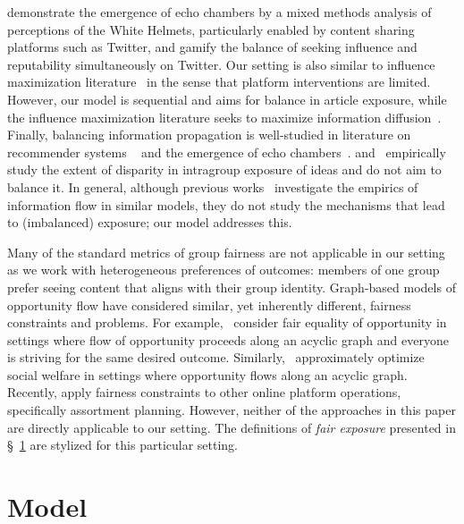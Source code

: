 \documentclass[letterpaper]{article} %
\begin{document}
\citet{starbird2018ecosystem} demonstrate the emergence of echo chambers by a mixed methods analysis of perceptions of the White Helmets, particularly enabled by content sharing platforms such as Twitter, and \citet{jeon2021chamberbreaker} gamify the balance of seeking influence and reputability simultaneously on Twitter.
Our setting is also similar to influence maximization literature~\citep{kempe2003maximizing} in the sense that platform interventions are limited.
However, our model is sequential and aims for balance in article exposure, while the influence maximization literature  seeks to maximize information diffusion~\citep{fish2019gaps,stoica2020seeding, ali2019fairness}.
Finally, balancing information propagation is well-studied in literature on recommender systems ~\citep{content_recommendation,adaptive_recommendation,NIPS2016_b0904096} and the emergence of echo chambers~\citep{barbera2015tweeting,mukerjee2020ideological,dubois2018echo,hosseinmardi2020evaluating}.
\citet{ReplicationExposure} and~\citet{balancedExposure} empirically study the extent of disparity in intragroup exposure of ideas and do not aim to balance it.
In general, although previous works~\citep{ReplicationExposure,balancedExposure} investigate the empirics of information flow in similar models, they do not study the mechanisms that lead to (imbalanced) exposure; our model addresses this.

Many of the standard metrics of group fairness are not applicable in our setting as we work with heterogeneous preferences of outcomes: members of one group prefer seeing content that aligns with their group identity.
Graph-based models of opportunity flow have considered similar, yet inherently different, fairness constraints and problems.
For example,~\citet{liu2021rawlsnet} consider fair equality of opportunity in settings where flow of opportunity proceeds along an acyclic graph and everyone is striving for the same desired outcome.
Similarly,~\citet{arunachaleswaran2021pipeline} approximately optimize social welfare in settings where opportunity flows along an acyclic graph.
Recently, \citet{chen2022fair} apply fairness constraints to other online platform operations, specifically assortment planning.
However, neither of the approaches in this paper are directly applicable to our setting.
The definitions of \emph{fair exposure} presented in \S~\ref{sec:model} are stylized for this particular setting.

\section{Model}\label{sec:model}
\end{document}

